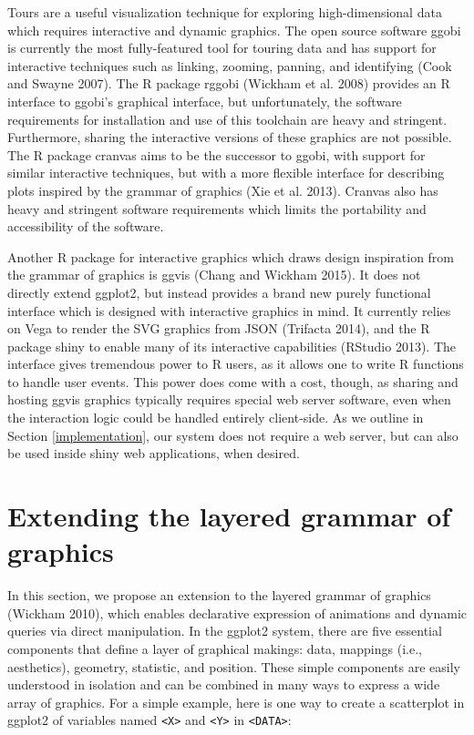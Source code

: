 \documentclass[12pt,]{article}
\theoremstyle{definition}
\theoremstyle{definition}
\theoremstyle{remark}
\begin{document}
Tours are a useful visualization technique for exploring
high-dimensional data which requires interactive and dynamic graphics.
The open source software ggobi is currently the most fully-featured tool
for touring data and has support for interactive techniques such as
linking, zooming, panning, and identifying (Cook and Swayne 2007). The R
package rggobi (Wickham et al. 2008) provides an R interface to ggobi's
graphical interface, but unfortunately, the software requirements for
installation and use of this toolchain are heavy and stringent.
Furthermore, sharing the interactive versions of these graphics are not
possible. The R package cranvas aims to be the successor to ggobi, with
support for similar interactive techniques, but with a more flexible
interface for describing plots inspired by the grammar of graphics (Xie
et al. 2013). Cranvas also has heavy and stringent software requirements
which limits the portability and accessibility of the software.

Another R package for interactive graphics which draws design
inspiration from the grammar of graphics is ggvis (Chang and Wickham
2015). It does not directly extend ggplot2, but instead provides a brand
new purely functional interface which is designed with interactive
graphics in mind. It currently relies on Vega to render the SVG graphics
from JSON (Trifacta 2014), and the R package shiny to enable many of its
interactive capabilities (RStudio 2013). The interface gives tremendous
power to R users, as it allows one to write R functions to handle user
events. This power does come with a cost, though, as sharing and hosting
ggvis graphics typically requires special web server software, even when
the interaction logic could be handled entirely client-side. As we
outline in Section \ref{implementation}, our system does not require a
web server, but can also be used inside shiny web applications, when
desired.

\section{Extending the layered grammar of
graphics}\label{extending-the-layered-grammar-of-graphics}

In this section, we propose an extension to the layered grammar of
graphics (Wickham 2010), which enables declarative expression of
animations and dynamic queries via direct manipulation. In the ggplot2
system, there are five essential components that define a layer of
graphical makings: data, mappings (i.e., aesthetics), geometry,
statistic, and position. These simple components are easily understood
in isolation and can be combined in many ways to express a wide array of
graphics. For a simple example, here is one way to create a scatterplot
in ggplot2 of variables named \texttt{\textless{}X\textgreater{}} and
\texttt{\textless{}Y\textgreater{}} in
\texttt{\textless{}DATA\textgreater{}}:
\end{document}
